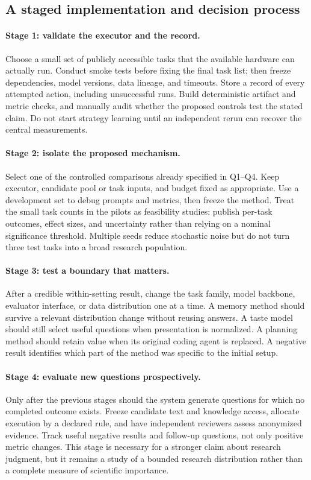 \subsection{A staged implementation and decision process}

\paragraph{Stage 1: validate the executor and the record.}
Choose a small set of publicly accessible tasks that the available hardware can actually run. Conduct smoke tests before fixing the final task list; then freeze dependencies, model versions, data lineage, and timeouts. Store a record of every attempted action, including unsuccessful runs. Build deterministic artifact and metric checks, and manually audit whether the proposed controls test the stated claim. Do not start strategy learning until an independent rerun can recover the central measurements.

\paragraph{Stage 2: isolate the proposed mechanism.}
Select one of the controlled comparisons already specified in Q1--Q4. Keep executor, candidate pool or task inputs, and budget fixed as appropriate. Use a development set to debug prompts and metrics, then freeze the method. Treat the small task counts in the pilots as feasibility studies: publish per-task outcomes, effect sizes, and uncertainty rather than relying on a nominal significance threshold. Multiple seeds reduce stochastic noise but do not turn three test tasks into a broad research population.

\paragraph{Stage 3: test a boundary that matters.}
After a credible within-setting result, change the task family, model backbone, evaluator interface, or data distribution one at a time. A memory method should survive a relevant distribution change without reusing answers. A taste model should still select useful questions when presentation is normalized. A planning method should retain value when its original coding agent is replaced. A negative result identifies which part of the method was specific to the initial setup.

\paragraph{Stage 4: evaluate new questions prospectively.}
Only after the previous stages should the system generate questions for which no completed outcome exists. Freeze candidate text and knowledge access, allocate execution by a declared rule, and have independent reviewers assess anonymized evidence. Track useful negative results and follow-up questions, not only positive metric changes. This stage is necessary for a stronger claim about research judgment, but it remains a study of a bounded research distribution rather than a complete measure of scientific importance.

